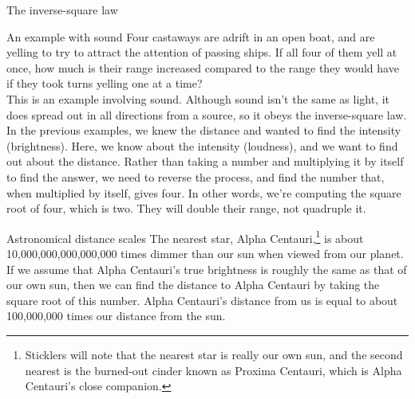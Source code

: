 \begin{envsubsection}{The inverse-square law}

\begin{eg}{An example with sound}
\egquestion Four castaways are adrift in an open boat, and are yelling to try to attract the
attention of passing ships. If all four of them yell at once, how much is their range
increased compared to the range they would have if they took turns yelling one at a time?\\
\eganswer This is an example involving sound. Although sound isn't the same as light,
it does spread out in all directions from a source, so it obeys the inverse-square
law. In the previous examples, we knew the distance and wanted to find the intensity
(brightness). Here, we know about the intensity (loudness), and we want to find out
about the distance. Rather than taking a number and multiplying it by itself to find the
answer, we need to reverse the process, and find the number that, when multiplied by
itself, gives four. In other words, we're computing the square root of four, which is
two. They will double their range, not quadruple it. 
\end{eg}

\begin{eg}{Astronomical distance scales}\label{eg:alphacdistance}
The nearest star, Alpha Centauri,\footnote{Sticklers will note that the nearest star
is really our own sun, and the second nearest is the burned-out cinder
known as Proxima Centauri, which is Alpha Centauri's close companion.}
is about 10,000,000,000,000,000 times dimmer than our sun when viewed from
our planet. If we assume that Alpha Centauri's true brightness is roughly the same
as that of our own sun, then we can find the distance to Alpha Centauri by
taking the square root of this number. Alpha Centauri's distance from us
is equal to about 100,000,000 times our distance from the sun.
\end{eg}


\end{envsubsection}
